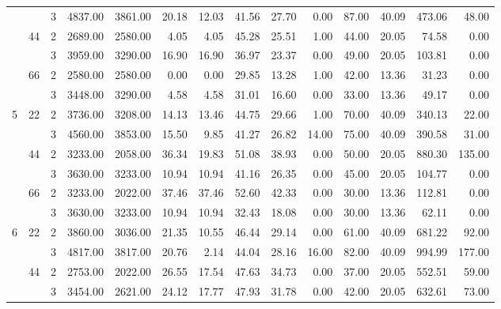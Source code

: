 \begin{tabular}{lllrrrrrrrrrrr}
  &    & 3 &  4837.00 &   3861.00 & 20.18 &   12.03 &   41.56 &   27.70 &    0.00 &   87.00 &   40.09 &  473.06 &    48.00 \\
\cline{2-14}
  & \multirow{2}{*}{44} & 2 &  2689.00 &   2580.00 &  4.05 &    4.05 &   45.28 &   25.51 &    1.00 &   44.00 &   20.05 &   74.58 &     0.00 \\
  &    & 3 &  3959.00 &   3290.00 & 16.90 &   16.90 &   36.97 &   23.37 &    0.00 &   49.00 &   20.05 &  103.81 &     0.00 \\
\cline{2-14}
  & \multirow{2}{*}{66} & 2 &  2580.00 &   2580.00 &  0.00 &    0.00 &   29.85 &   13.28 &    1.00 &   42.00 &   13.36 &   31.23 &     0.00 \\
  &    & 3 &  3448.00 &   3290.00 &  4.58 &    4.58 &   31.01 &   16.60 &    0.00 &   33.00 &   13.36 &   49.17 &     0.00 \\
\cline{1-14}
\cline{2-14}
\multirow{6}{*}{5} & \multirow{2}{*}{22} & 2 &  3736.00 &   3208.00 & 14.13 &   13.46 &   44.75 &   29.66 &    1.00 &   70.00 &   40.09 &  340.13 &    22.00 \\
  &    & 3 &  4560.00 &   3853.00 & 15.50 &    9.85 &   41.27 &   26.82 &   14.00 &   75.00 &   40.09 &  390.58 &    31.00 \\
\cline{2-14}
  & \multirow{2}{*}{44} & 2 &  3233.00 &   2058.00 & 36.34 &   19.83 &   51.08 &   38.93 &    0.00 &   50.00 &   20.05 &  880.30 &   135.00 \\
  &    & 3 &  3630.00 &   3233.00 & 10.94 &   10.94 &   41.16 &   26.35 &    0.00 &   45.00 &   20.05 &  104.77 &     0.00 \\
\cline{2-14}
  & \multirow{2}{*}{66} & 2 &  3233.00 &   2022.00 & 37.46 &   37.46 &   52.60 &   42.33 &    0.00 &   30.00 &   13.36 &  112.81 &     0.00 \\
  &    & 3 &  3630.00 &   3233.00 & 10.94 &   10.94 &   32.43 &   18.08 &    0.00 &   30.00 &   13.36 &   62.11 &     0.00 \\
\cline{1-14}
\cline{2-14}
\multirow{6}{*}{6} & \multirow{2}{*}{22} & 2 &  3860.00 &   3036.00 & 21.35 &   10.55 &   46.44 &   29.14 &    0.00 &   61.00 &   40.09 &  681.22 &    92.00 \\
  &    & 3 &  4817.00 &   3817.00 & 20.76 &    2.14 &   44.04 &   28.16 &   16.00 &   82.00 &   40.09 &  994.99 &   177.00 \\
\cline{2-14}
  & \multirow{2}{*}{44} & 2 &  2753.00 &   2022.00 & 26.55 &   17.54 &   47.63 &   34.73 &    0.00 &   37.00 &   20.05 &  552.51 &    59.00 \\
  &    & 3 &  3454.00 &   2621.00 & 24.12 &   17.77 &   47.93 &   31.78 &    0.00 &   42.00 &   20.05 &  632.61 &    73.00 \\

\end{tabular}
